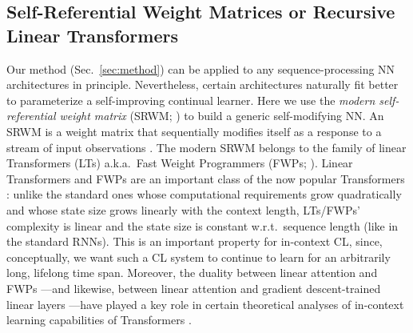 \documentclass{article}
\begin{document}
\subsection{Self-Referential Weight Matrices or Recursive Linear Transformers}
\label{sec:fwp}
Our method (Sec.~\ref{sec:method}) can be applied to any sequence-processing NN architectures in principle.
Nevertheless, certain architectures naturally fit better to parameterize a self-improving continual learner.
Here we use the \textit{modern self-referential weight matrix} (SRWM; \citet{IrieSCS22,irie2023practical}) to build a generic self-modifying NN.
An SRWM is a weight matrix that sequentially modifies itself as a response to a stream of input observations \citep{Schmidhuber:92selfref, Schmidhuber:93selfreficann}.
The modern SRWM belongs to the family of linear Transformers (LTs) a.k.a.~Fast Weight Programmers (FWPs; \citet{Schmidhuber:91fastweights, schmidhuber1992learning, katharopoulos2020transformers, choromanski2020rethinking, peng2021random, schlag2021linear, irie2021going}).
Linear Transformers and FWPs are an important class of the now popular Transformers \citep{trafo}:
unlike the standard ones whose computational requirements grow quadratically and whose state size grows linearly with the context length, LTs/FWPs' complexity is linear and the state size is constant w.r.t.~sequence length (like in the standard RNNs).
This is an important property for in-context CL, since, conceptually, we want such a CL system to continue to learn for an arbitrarily long, lifelong time span.
Moreover, the duality between linear attention and FWPs \citep{schlag2021linear}---and likewise, between linear attention and gradient descent-trained linear layers \citep{irie2022dual, aizerman1964theoretical}---have played a key role in certain theoretical analyses of in-context learning capabilities of Transformers \citep{von2022transformers, dai2022can}.
\end{document}
